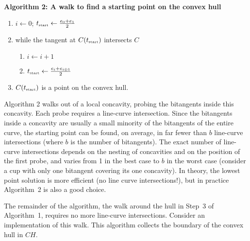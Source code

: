 \documentclass[11pt]{article}
\begin{document}
\vspace{.2in}

\centerline{{\bf Algorithm 2: A walk to find a starting point on the convex hull}}

\begin{enumerate}

\item $i \leftarrow 0$; $t_{\mbox{\tiny{start}}} \leftarrow \frac{e_0 + e_1}{2}$
\item while the tangent at $C(t_{\mbox{\tiny{start}}})$ intersects $C$
\begin{enumerate}
\item	$i \leftarrow i + 1$
\item	$t_{\mbox{\tiny{start}}} \leftarrow \frac{e_{i} + e_{i \oplus 1}}{2}$
\end{enumerate}
\item $C(t_{\mbox{\tiny{start}}})$ is a point on the convex hull.
\end{enumerate}

Algorithm 2 walks out of a local concavity, probing the bitangents inside this concavity.
Each probe requires a line-curve intersection.
Since the bitangents inside a concavity are usually a small minority of the 
bitangents of the entire curve, 
the starting point can be found, on average, in far fewer than $b$ line-curve intersections
(where $b$ is the number of bitangents).
The exact number of line-curve intersections depends on the nesting of concavities and on
the position of the first probe, and varies from 1 in the best case to $b$ in the worst case
(consider a cup with only one bitangent covering its one concavity).
In theory, the lowest point solution is more efficient (no line curve intersections!), 
but in practice Algorithm~2 is also a good choice.

The remainder of the algorithm, the walk around the hull in Step~3 of Algorithm~1, 
requires no more line-curve intersections.
Consider an implementation of this walk.
This algorithm collects the boundary of the convex hull in $CH$.
\end{document}
